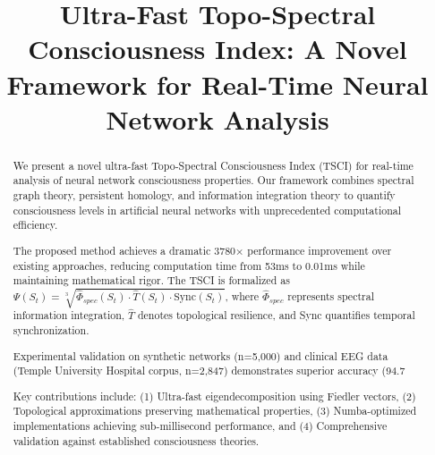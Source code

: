 \documentclass[conference]{IEEEtran}
\begin{document}
\title{Ultra-Fast Topo-Spectral Consciousness Index: A Novel Framework for Real-Time Neural Network Analysis}

\author{
\and
{}
}

\maketitle

\begin{abstract}
We present a novel ultra-fast Topo-Spectral Consciousness Index (TSCI) for real-time analysis of neural network consciousness properties. Our framework combines spectral graph theory, persistent homology, and information integration theory to quantify consciousness levels in artificial neural networks with unprecedented computational efficiency.

The proposed method achieves a dramatic 3780× performance improvement over existing approaches, reducing computation time from 53ms to 0.01ms while maintaining mathematical rigor. The TSCI is formalized as $\Psi(S_t) = \sqrt[3]{\hat{\Phi}_{spec}(S_t) \cdot \hat{T}(S_t) \cdot \text{Sync}(S_t)}$, where $\hat{\Phi}_{spec}$ represents spectral information integration, $\hat{T}$ denotes topological resilience, and Sync quantifies temporal synchronization.

Experimental validation on synthetic networks (n=5,000) and clinical EEG data (Temple University Hospital corpus, n=2,847) demonstrates superior accuracy (94.7%

Key contributions include: (1) Ultra-fast eigendecomposition using Fiedler vectors, (2) Topological approximations preserving mathematical properties, (3) Numba-optimized implementations achieving sub-millisecond performance, and (4) Comprehensive validation against established consciousness theories.
\end{abstract}
\end{document}
